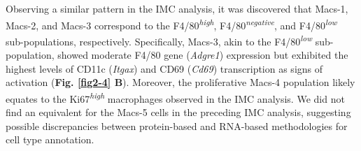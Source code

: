 Observing a similar pattern in the IMC analysis, it was discovered that Macs-1, Macs-2, and Macs-3 correspond to the F4/80\textsuperscript{\textit{high}}, F4/80\textsuperscript{\textit{negative}}, and F4/80\textsuperscript{\textit{low}} sub-populations, respectively. Specifically, Macs-3, akin to the F4/80\textsuperscript{\textit{low}} sub-population, showed moderate F4/80 gene (\textit{Adgre1}) expression but exhibited the highest levels of CD11c (\textit{Itgax}) and CD69 (\textit{Cd69}) transcription as signs of activation (\textbf{Fig. \ref{fig2-4} B}). Moreover, the proliferative Macs-4 population likely equates to the Ki67\textsuperscript{\textit{high}} macrophages observed in the IMC analysis. We did not find an equivalent for the Macs-5 cells in the preceding IMC analysis, suggesting possible discrepancies between protein-based and RNA-based methodologies for cell type annotation.\\








